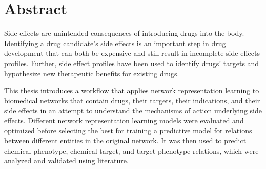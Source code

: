 \chapter*{Abstract}

Side effects are unintended consequences of introducing drugs into the body.
Identifying a drug candidate's side effects is an important step in drug development that can both be expensive and still result in incomplete side effects profiles.
Further, side effect profiles have been used to identify drugs' targets and hypothesize new therapeutic benefits for existing drugs.

This thesis introduces a workflow that applies network representation learning to biomedical networks that contain drugs, their targets, their indications, and their side effects in an attempt to understand the mechanisms of action underlying side effects.
Different network representation learning models were evaluated and optimized before selecting the best for training a predictive model for relations between different entities in the original network.
It was then used to predict chemical-phenotype, chemical-target, and target-phenotype relations, which were analyzed and validated using literature.
